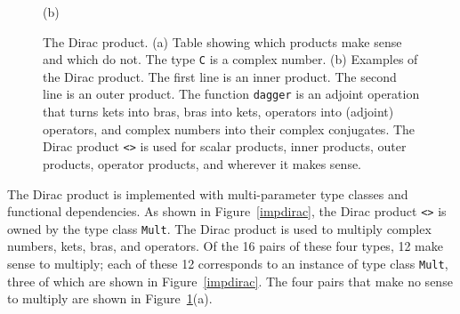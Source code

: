 \documentclass{eptcs}
\newcommand{\DataTypeTok}[1]{\textcolor[rgb]{0.56,0.13,0.00}{{#1}}}
\newcommand{\FunctionTok}[1]{\textcolor[rgb]{0.02,0.16,0.49}{{#1}}}
\newcommand{\OperatorTok}[1]{\textcolor[rgb]{0.40,0.40,0.40}{{#1}}}
\begin{document}
\begin{figure}
\begin{center}
(b)
\end{center}
\caption{The Dirac product.  (a)  Table showing which products make sense and which do not.
  The type \DataTypeTok{\texttt{C}} is a complex number.
  (b)  Examples of the Dirac product.
  The first line is an inner product.
  The second line is an outer product.
  The function \FunctionTok{\texttt{dagger}} is an adjoint operation
  that turns kets into bras, bras into kets, operators into
  (adjoint) operators, and complex numbers into their complex conjugates.
  The Dirac product \OperatorTok{\texttt{<>}} is used for scalar
  products, inner products, outer products, operator products, and wherever
  it makes sense.
}
\label{products}
\end{figure}

The Dirac product is implemented with multi-parameter type classes
and functional dependencies.  As shown in Figure~\ref{impdirac},
the Dirac product \OperatorTok{\texttt{<>}} is owned by the type class
\DataTypeTok{\texttt{Mult}}.  The Dirac product is used to multiply
complex numbers, kets, bras, and operators.  Of the 16 pairs of
these four types, 12 make sense to multiply; each of these 12 corresponds
to an instance of type class \DataTypeTok{\texttt{Mult}}, three of
which are shown in Figure~\ref{impdirac}.  The four pairs that
make no sense to multiply are shown in Figure~\ref{products}(a).
\end{document}
